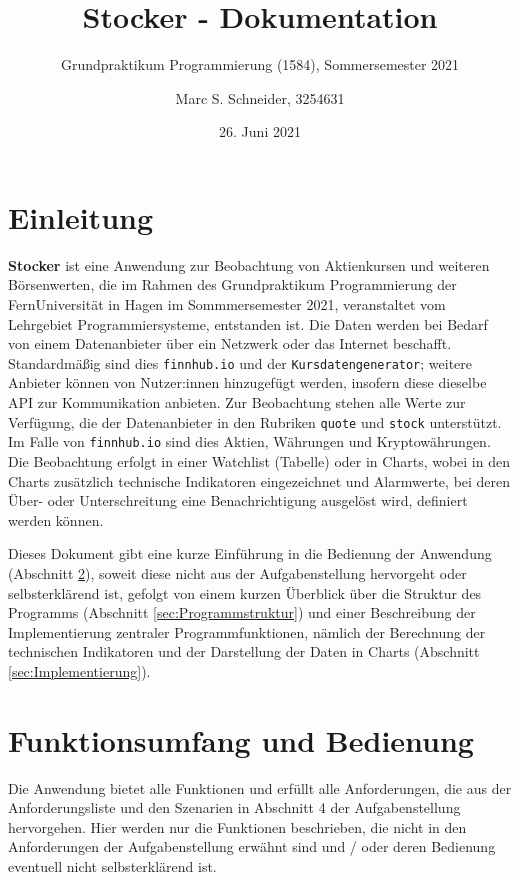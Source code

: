 \documentclass[fontsize=12pt, paper=a4, pagesize=auto, twoside=false, DIV=11, draft=false]{scrartcl}
\title{Stocker - Dokumentation}
\subtitle{Grundpraktikum Programmierung (1584), Sommersemester 2021}
\author{Marc S. Schneider, 3254631}
\date{26. Juni 2021}
\begin{document}
\maketitle

\section{Einleitung}
\textbf{Stocker} ist eine Anwendung zur Beobachtung von Aktienkursen und weiteren Börsenwerten, die im Rahmen des Grundpraktikum Programmierung der FernUniversität in Hagen im Sommmersemester 2021, veranstaltet vom Lehrgebiet Programmiersysteme, entstanden ist. Die Daten werden bei Bedarf von einem Datenanbieter über ein Netzwerk oder das Internet beschafft. Standardmäßig sind dies \texttt{finnhub.io} und der \texttt{Kursdatengenerator}; weitere Anbieter können von Nutzer:innen hinzugefügt werden, insofern diese dieselbe API zur Kommunikation anbieten. Zur Beobachtung stehen alle Werte zur Verfügung, die der Datenanbieter in den Rubriken \texttt{quote} und \texttt{stock} unterstützt. Im Falle von \texttt{finnhub.io} sind dies Aktien, Währungen und Kryptowährungen. Die Beobachtung erfolgt in einer Watchlist (Tabelle) oder in Charts, wobei in den Charts zusätzlich technische Indikatoren eingezeichnet und Alarmwerte, bei deren Über- oder Unterschreitung eine Benachrichtigung ausgelöst wird, definiert werden können.

Dieses Dokument gibt eine kurze Einführung in die Bedienung der Anwendung (Abschnitt \ref{sec:Bedienung}), soweit diese nicht aus der Aufgabenstellung hervorgeht oder selbsterklärend ist, gefolgt von einem kurzen Überblick über die Struktur des Programms (Abschnitt \ref{sec:Programmstruktur}) und einer Beschreibung der Implementierung zentraler Programmfunktionen, nämlich der Berechnung der technischen Indikatoren und der Darstellung der Daten in Charts (Abschnitt \ref{sec:Implementierung}).

\section{Funktionsumfang und Bedienung}
\label{sec:Bedienung}
Die Anwendung bietet alle Funktionen und erfüllt alle Anforderungen, die aus der Anforderungsliste und den Szenarien in Abschnitt 4 der Aufgabenstellung hervorgehen. Hier werden nur die Funktionen beschrieben, die nicht in den Anforderungen der Aufgabenstellung erwähnt sind und / oder deren Bedienung eventuell nicht selbsterklärend ist.
\end{document}
